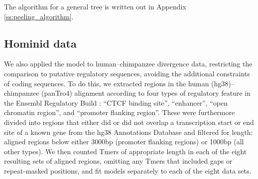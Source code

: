 \documentclass{article}
\theoremstyle{plain}
\theoremstyle{definition}
\begin{document}
The algorithm for a general tree is written out in Appendix \ref{ss:peeling_algorithm}.


\subsection{Hominid data}

We also applied the model to human--chimpanzee divergence data,
restricting the comparison to putative regulatory sequences,
avoiding the additional constraints of coding sequences.
To do this, we extracted regions in the human (hg38)--chimpanzee (panTro4) alignment %
according to four types of regulatory feature in the Ensembl Regulatory Build \citep[release 81][]{zerbino2015ensembl}:
``CTCF binding site'', ``enhancer'', ``open chromatin region'', and ``promoter flanking region''.
These were furthermore divided into regions that either did or did not overlap a transcription start or end site of a known gene
from the hg38 Annotations Database \citep{kent2002human}
and filtered for length:
aligned regions below either 3000bp (promoter flanking regions) or 1000bp (all other types).
We then counted Tmers of appropriate length in each of the eight resulting sets of aligned regions, omitting any Tmers that included gaps or repeat-masked positions,
and fit models separately to each of the eight data sets.
\end{document}

